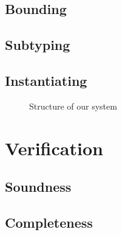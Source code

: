 \documentclass{llncs}
\begin{document}
\subsection{Bounding}
\subsection{Subtyping}
\subsection{Instantiating}

\begin{figure}

\label{fig:cons}
\caption{Structure of our system}
\end{figure}
\begin{figure}

\end{figure}
\begin{figure}

\end{figure}
\begin{figure}

\end{figure}
\begin{figure}

\end{figure}


\section{Verification}
\subsection{Soundness}
\subsection{Completeness}
\end{document}
